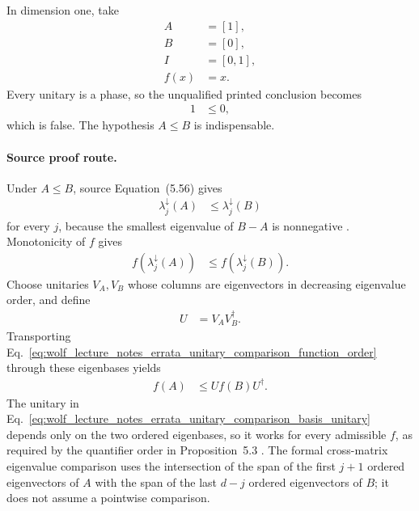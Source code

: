 \documentclass{article}
\begin{document}
In dimension one, take
\begin{align}
    A&=[1],
    \label{eq:wolf_lecture_notes_errata_unitary_comparison_counterexample_a}\\
    B&=[0],
    \label{eq:wolf_lecture_notes_errata_unitary_comparison_counterexample_b}\\
    I&=[0,1],
    \label{eq:wolf_lecture_notes_errata_unitary_comparison_counterexample_interval}\\
    f(x)&=x.
    \label{eq:wolf_lecture_notes_errata_unitary_comparison_counterexample_function}
\end{align}
Every unitary is a phase, so the unqualified printed conclusion becomes
\begin{align}
    1&\leq0,
    \label{eq:wolf_lecture_notes_errata_unitary_comparison_counterexample_contradiction}
\end{align}
which is false. The hypothesis $A\leq B$ is indispensable.

\paragraph{Source proof route.}
Under $A\leq B$, source Equation~(5.56) gives
\begin{align}
    \lambda_j^\downarrow(A)
        &\leq\lambda_j^\downarrow(B)
    \label{eq:wolf_lecture_notes_errata_unitary_comparison_eigenvalue_order}
\end{align}
for every $j$, because the smallest eigenvalue of $B-A$ is nonnegative
\cite[Equation~(5.56)]{Wolf2012Quantum}. Monotonicity of $f$ gives
\begin{align}
    f(\lambda_j^\downarrow(A))
        &\leq f(\lambda_j^\downarrow(B)).
    \label{eq:wolf_lecture_notes_errata_unitary_comparison_function_order}
\end{align}
Choose unitaries $V_A,V_B$ whose columns are eigenvectors in decreasing
eigenvalue order, and define
\begin{align}
    U
        &=V_AV_B^\dagger.
    \label{eq:wolf_lecture_notes_errata_unitary_comparison_basis_unitary}
\end{align}
Transporting
Eq.~\ref{eq:wolf_lecture_notes_errata_unitary_comparison_function_order}
through these eigenbases yields
\begin{align}
    f(A)
        &\leq Uf(B)U^\dagger.
    \label{eq:wolf_lecture_notes_errata_unitary_comparison_transported_order}
\end{align}
The unitary in
Eq.~\ref{eq:wolf_lecture_notes_errata_unitary_comparison_basis_unitary}
depends only on the two ordered eigenbases, so it works for every admissible
$f$, as required by the quantifier order in Proposition~5.3
\cite{Wolf2012Quantum}. The formal cross-matrix eigenvalue comparison uses the
intersection of the span of the first $j+1$ ordered eigenvectors of $A$ with
the span of the last $d-j$ ordered eigenvectors of $B$; it does not assume a
pointwise comparison.
\end{document}
